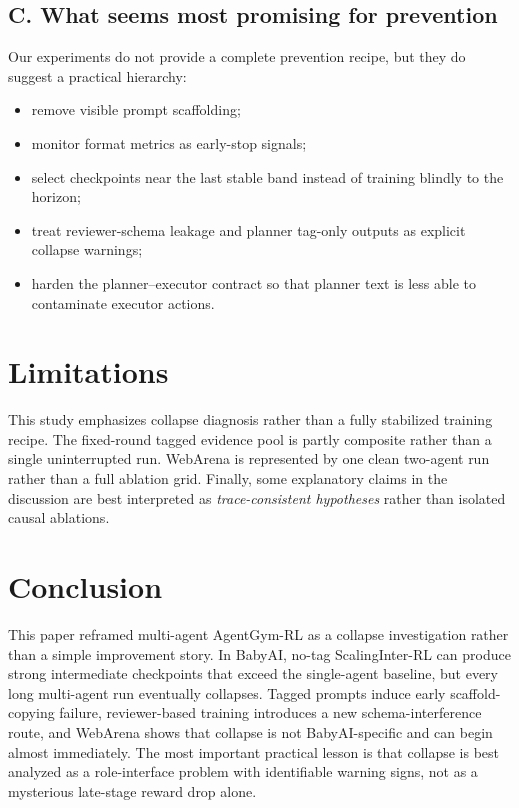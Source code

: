\documentclass{ieeeaccess}
\begin{document}
\subsection{C. What seems most promising for prevention}
Our experiments do not provide a complete prevention recipe, but they do suggest a practical hierarchy:
\begin{itemize}
\item remove visible prompt scaffolding;
\item monitor format metrics as early-stop signals;
\item select checkpoints near the last stable band instead of training blindly to the horizon;
\item treat reviewer-schema leakage and planner tag-only outputs as explicit collapse warnings;
\item harden the planner--executor contract so that planner text is less able to contaminate executor actions.
\end{itemize}

\section{Limitations}
This study emphasizes collapse diagnosis rather than a fully stabilized training recipe. The fixed-round tagged evidence pool is partly composite rather than a single uninterrupted run. WebArena is represented by one clean two-agent run rather than a full ablation grid. Finally, some explanatory claims in the discussion are best interpreted as \emph{trace-consistent hypotheses} rather than isolated causal ablations.

\section{Conclusion}
This paper reframed multi-agent AgentGym-RL as a collapse investigation rather than a simple improvement story. In BabyAI, no-tag ScalingInter-RL can produce strong intermediate checkpoints that exceed the single-agent baseline, but every long multi-agent run eventually collapses. Tagged prompts induce early scaffold-copying failure, reviewer-based training introduces a new schema-interference route, and WebArena shows that collapse is not BabyAI-specific and can begin almost immediately. The most important practical lesson is that collapse is best analyzed as a role-interface problem with identifiable warning signs, not as a mysterious late-stage reward drop alone.

\FloatBarrier
\clearpage

\nocite{agentgymrl2025,babyai2018,webarena2023,scienceworld2022,agentbench2023}
\nocite{maddpg2017,qmix2018,mappo2021,autogen2023,metagpt2023,camel2023}




\EOD
\end{document}
